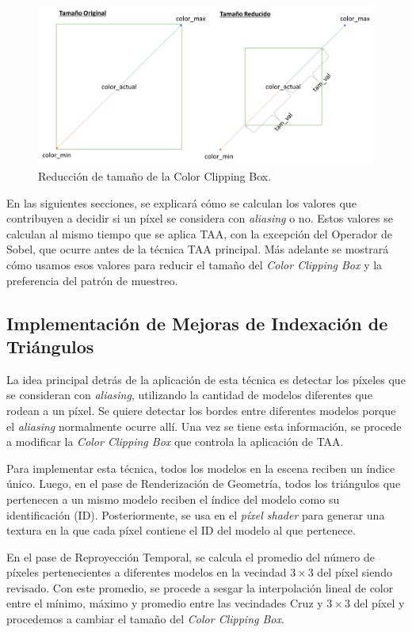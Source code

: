\documentclass[pregrado]{tesis-usb} %
\begin{document}
\begin{figure}[!hbt]
	\centering
	\includegraphics[scale=0.3]{images/clipping_box_reduction.png}
	\caption{Reducción de tamaño de la Color Clipping Box.}\label{fig:colorclippingboxredux}
\end{figure}

En las siguientes secciones, se explicará cómo se calculan los valores que contribuyen a decidir si un píxel se considera con \textit{aliasing} o no. Estos valores se calculan al mismo tiempo que se aplica TAA, con la excepción del Operador de Sobel, que ocurre antes de la técnica TAA principal. Más adelante se mostrará cómo usamos esos valores para reducir el tamaño del \textit{Color Clipping Box} y la preferencia del patrón de muestreo.

\subsection{Implementación de Mejoras de Indexación de Triángulos}
La idea principal detrás de la aplicación de esta técnica es detectar los píxeles que se consideran con \textit{aliasing}, utilizando la cantidad de modelos diferentes que rodean a un píxel. Se quiere detectar los bordes entre diferentes modelos porque el \textit{aliasing} normalmente ocurre allí. Una vez se tiene esta información, se procede a modificar la \textit{Color Clipping Box} que controla la aplicación de TAA.

Para implementar esta técnica, todos los modelos en la escena reciben un índice único. Luego, en el pase de Renderización de Geometría, todos los triángulos que pertenecen a un mismo modelo reciben el índice del modelo como su identificación (ID). Posteriormente, se usa en el \textit{píxel shader} para generar una textura en la que cada píxel contiene el ID del modelo al que pertenece.

En el pase de Reproyección Temporal, se calcula el promedio del número de píxeles pertenecientes a diferentes modelos en la vecindad $3\times 3$ del píxel siendo revisado. Con este promedio, se procede a sesgar la interpolación lineal de color entre el mínimo, máximo y promedio entre las vecindades Cruz y $3\times 3$ del píxel y procedemos a cambiar el tamaño del \textit{Color Clipping Box}.
\end{document}
